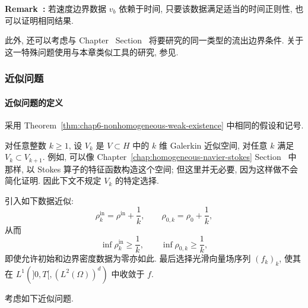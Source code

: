 \begin{sloppypar}
\par\noindent{}\textbf{Remark~\thechaptersixsectiontworemark:}\label{rem:chap6-time-dependent-boundary-data}
若速度边界数据 $v_b$ 依赖于时间, 只要该数据满足适当的时间正则性, 也可以证明相同结果.

此外, 还可以考虑与 Chapter~ Section~ 将要研究的同一类型的流出边界条件. 关于这一特殊问题使用与本章类似工具的研究, 参见.

\subsubsection{近似问题}
\label{subsec:chap6-approximate-problem}

\paragraph{近似问题的定义}
\label{subsec:chap6-approximate-problem-definition}

采用 Theorem~\ref{thm:chap6-nonhomogeneous-weak-existence} 中相同的假设和记号.

对任意整数 $k\geq1$, 设 $V_k$ 是 $V\subset H$ 中的 $k$ 维 Galerkin 近似空间, 对任意 $k$ 满足 $V_k\subset V_{k+1}$. 例如, 可以像 Chapter~\ref{chap:homogeneous-navier-stokes} Section~ 中那样, 以 Stokes 算子的特征函数构造这个空间; 但这里并无必要, 因为这样做不会简化证明. 因此下文不规定 $V_k$ 的特定选择.

引入如下数据近似:
\begin{equation}
 \rho_k^{\mathrm{in}}=\rho^{\mathrm{in}}+\frac1k,
 \qquad
 \rho_{0,k}=\rho_0+\frac1k,
\label{eq:chap6-positive-density-approximations}
\end{equation}
从而
\[
 \inf\rho_k^{\mathrm{in}}\geq\frac1k,
 \qquad
 \inf\rho_{0,k}\geq\frac1k,
\]
即使允许初始和边界密度数据为零亦如此. 最后选择光滑向量场序列 $(f_k)_k$, 使其在 $L^1(]0,T[,(L^2(\Omega))^d)$ 中收敛于 $f$.

考虑如下近似问题.


\end{sloppypar}

